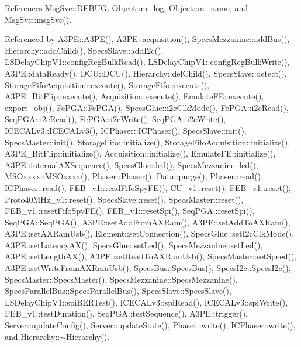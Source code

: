 References Msg\+Svc\+::\+D\+E\+B\+UG, Object\+::m\+\_\+log, Object\+::m\+\_\+name, and Msg\+Svc\+::msg\+Svc().



Referenced by A3\+P\+E\+::\+A3\+P\+E(), A3\+P\+E\+::acquisition(), Specs\+Mezzanine\+::add\+Bus(), Hierarchy\+::add\+Child(), Specs\+Slave\+::add\+I2c(), L\+S\+Delay\+Chip\+V1\+::config\+Reg\+Bulk\+Read(), L\+S\+Delay\+Chip\+V1\+::config\+Reg\+Bulk\+Write(), A3\+P\+E\+::data\+Ready(), D\+C\+U\+::\+D\+C\+U(), Hierarchy\+::del\+Child(), Specs\+Slave\+::detect(), Storage\+Fifo\+Acquisition\+::execute(), Storage\+Fifo\+::execute(), A3\+P\+E\+\_\+\+Bit\+Flip\+::execute(), Acquisition\+::execute(), Emulate\+F\+E\+::execute(), export\+\_\+obj(), Fe\+P\+G\+A\+::\+Fe\+P\+G\+A(), Specs\+Glue\+::i2c\+Clk\+Mode(), Fe\+P\+G\+A\+::i2c\+Read(), Seq\+P\+G\+A\+::i2c\+Read(), Fe\+P\+G\+A\+::i2c\+Write(), Seq\+P\+G\+A\+::i2c\+Write(), I\+C\+E\+C\+A\+Lv3\+::\+I\+C\+E\+C\+A\+Lv3(), I\+C\+Phaser\+::\+I\+C\+Phaser(), Specs\+Slave\+::init(), Specs\+Master\+::init(), Storage\+Fifo\+::initialize(), Storage\+Fifo\+Acquisition\+::initialize(), A3\+P\+E\+\_\+\+Bit\+Flip\+::initialize(), Acquisition\+::initialize(), Emulate\+F\+E\+::initialize(), A3\+P\+E\+::internal\+A\+X\+Sequence(), Specs\+Glue\+::led(), Specs\+Mezzanine\+::led(), M\+S\+Oxxxx\+::\+M\+S\+Oxxxx(), Phaser\+::\+Phaser(), Data\+::purge(), Phaser\+::read(), I\+C\+Phaser\+::read(), F\+E\+B\+\_\+v1\+::read\+Fifo\+Spy\+F\+E(), C\+U\+\_\+v1\+::reset(), F\+E\+B\+\_\+v1\+::reset(), Proto40\+M\+Hz\+\_\+v1\+::reset(), Specs\+Slave\+::reset(), Specs\+Master\+::reset(), F\+E\+B\+\_\+v1\+::reset\+Fifo\+Spy\+F\+E(), F\+E\+B\+\_\+v1\+::reset\+Spi(), Seq\+P\+G\+A\+::reset\+Spi(), Seq\+P\+G\+A\+::\+Seq\+P\+G\+A(), A3\+P\+E\+::set\+Add\+From\+A\+X\+Ram(), A3\+P\+E\+::set\+Add\+To\+A\+X\+Ram(), A3\+P\+E\+::set\+A\+X\+Ram\+Usb(), Element\+::set\+Connection(), Specs\+Glue\+::set\+I2c\+Clk\+Mode(), A3\+P\+E\+::set\+Latency\+A\+X(), Specs\+Glue\+::set\+Led(), Specs\+Mezzanine\+::set\+Led(), A3\+P\+E\+::set\+Length\+A\+X(), A3\+P\+E\+::set\+Read\+To\+A\+X\+Ram\+Usb(), Specs\+Master\+::set\+Speed(), A3\+P\+E\+::set\+Write\+From\+A\+X\+Ram\+Usb(), Specs\+Bus\+::\+Specs\+Bus(), Specs\+I2c\+::\+Specs\+I2c(), Specs\+Master\+::\+Specs\+Master(), Specs\+Mezzanine\+::\+Specs\+Mezzanine(), Specs\+Parallel\+Bus\+::\+Specs\+Parallel\+Bus(), Specs\+Slave\+::\+Specs\+Slave(), L\+S\+Delay\+Chip\+V1\+::spi\+B\+E\+R\+Test(), I\+C\+E\+C\+A\+Lv3\+::spi\+Read(), I\+C\+E\+C\+A\+Lv3\+::spi\+Write(), F\+E\+B\+\_\+v1\+::test\+Duration(), Seq\+P\+G\+A\+::test\+Sequence(), A3\+P\+E\+::trigger(), Server\+::update\+Config(), Server\+::update\+State(), Phaser\+::write(), I\+C\+Phaser\+::write(), and Hierarchy\+::$\sim$\+Hierarchy().


